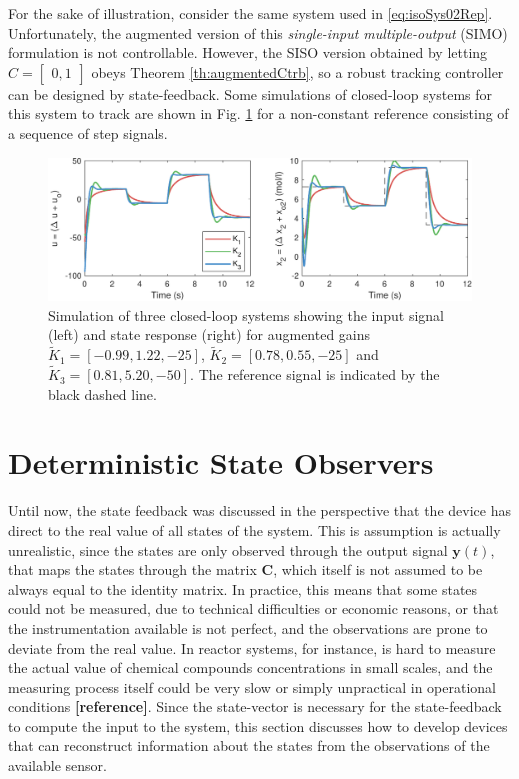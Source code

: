 \documentclass[a4paper,11pt]{book}
\numberwithin{figure}{chapter}
\numberwithin{equation}{chapter}
\numberwithin{table}{chapter}
\theoremstyle{definition}
\begin{document}
For the sake of illustration, consider the same system used in \eqref{eq:isoSys02Rep}. Unfortunately, the augmented version of this \textit{single-input multiple-output} (SIMO) formulation is not controllable. However, the SISO version obtained by letting $C = \begin{bmatrix} 0, 1 \end{bmatrix}$ obeys Theorem \ref{th:augmentedCtrb}, so a robust tracking controller can be designed by state-feedback. Some simulations of closed-loop systems for this system to track are shown in Fig. \ref{fig:tracking03} for a non-constant reference consisting of a sequence of step signals.

\begin{figure}[ht]
    \centering
    \includegraphics[width=\textwidth]{chapter3/report_ch3_2}
    \caption{Simulation of three closed-loop systems showing the input signal (left) and state response (right) for augmented gains $\tilde{K}_1 = [-0.99, 1.22, -25]$, $\tilde{K}_2 = [0.78, 0.55, -25]$ and $\tilde{K}_3 = [0.81, 5.20, -50]$. The reference signal is indicated by the black dashed line.}
    \label{fig:tracking03}
\end{figure}


\section{Deterministic State Observers}

Until now, the state feedback was discussed in the perspective that the device has direct to the real value of all states of the system. This is assumption is actually unrealistic, since the states are only observed through the output signal $\bm{y}(t)$, that maps the states through the matrix $\bm{C}$, which itself is not assumed to be always equal to the identity matrix. In practice, this means that some states could not be measured, due to technical difficulties or economic reasons, or that the instrumentation available is not perfect, and the observations are prone to deviate from the real value. In reactor systems, for instance, is hard to measure the actual value of chemical compounds concentrations in small scales, and the measuring process itself could be very slow or simply unpractical in operational conditions \textbf{[reference]}. Since the state-vector is necessary for the state-feedback to compute the input to the system, this section discusses how to develop devices that can reconstruct information about the states from the observations of the available sensor.
\end{document}
